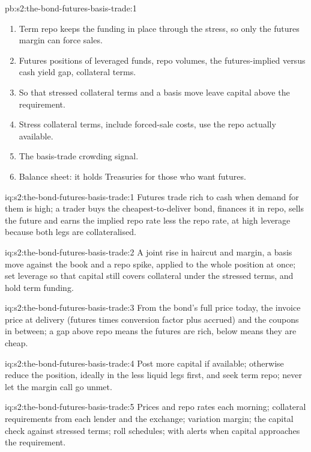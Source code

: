 \begin{solution}{pb:s2:the-bond-futures-basis-trade:1}
\begin{enumerate}
\item Term repo keeps the funding in place through the stress, so only the futures margin can force sales.
\item Futures positions of leveraged funds, repo volumes, the futures-implied versus cash yield gap, collateral terms.
\item So that stressed collateral terms and a basis move leave capital above the requirement.
\item Stress collateral terms, include forced-sale costs, use the repo actually available.
\item The basis-trade crowding signal.
\item Balance sheet: it holds Treasuries for those who want futures.
\end{enumerate}
\end{solution}

\begin{solution}{iq:s2:the-bond-futures-basis-trade:1}
Futures trade rich to cash when demand for them is high; a trader buys the cheapest-to-deliver bond, finances it in repo, sells the future and earns
the implied repo rate less the repo rate, at high leverage because both legs are collateralised.
\end{solution}

\begin{solution}{iq:s2:the-bond-futures-basis-trade:2}
A joint rise in haircut and margin, a basis move against the book and a repo spike, applied to the whole position at once; set leverage so that
capital still covers collateral under the stressed terms, and hold term funding.
\end{solution}

\begin{solution}{iq:s2:the-bond-futures-basis-trade:3}
From the bond's full price today, the invoice price at delivery (futures times conversion factor plus accrued) and the coupons in between; a gap above
repo means the futures are rich, below means they are cheap.
\end{solution}

\begin{solution}{iq:s2:the-bond-futures-basis-trade:4}
Post more capital if available; otherwise reduce the position, ideally in the less liquid legs first, and seek term repo; never let the margin call
go unmet.
\end{solution}

\begin{solution}{iq:s2:the-bond-futures-basis-trade:5}
Prices and repo rates each morning; collateral requirements from each lender and the exchange; variation margin; the capital check against stressed
terms; roll schedules; with alerts when capital approaches the requirement.
\end{solution}

